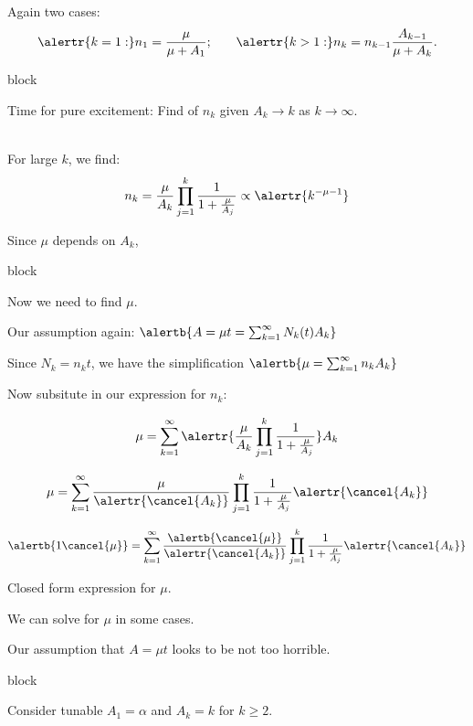     Again two cases:
    $$
    {
      \alertr{k=1:}
      n_1 = \frac{\mu}{\mu+A_1};
    }
    \qquad
    {
      \alertr{k>1:}
      n_k
      =
      n_{k-1}\frac{A_{k-1}}{\mu + A_k}.
    }
    $$

  
  

{block}{}
  
  
    Time for pure excitement: Find  
    of $n_k$ given $A_k \rightarrow k$ as $k \rightarrow \infty$.
  
    \\
    For large $k$, we find:
    $$
    n_k = 
    \frac{\mu}{A_k}
    \prod_{j=1}^{k}
    \frac{1}{1 + \frac{\mu}{A_j}}
    \propto
    \alertr{ k^{-\mu-1}}
    $$
  
    Since $\mu$ depends on $A_k$, 
  
  

{block}{}
  
  
    Now we need to find $\mu$.
  
    Our assumption again:
    $
    \alertb{A = \mu t = \sum_{k=1}^{\infty} N_k(t) A_k}
    $
  
    Since $N_k = n_k t$, we have the simplification
    $
    \alertb{
    \mu = \sum_{k=1}^{\infty} n_k A_k}
    $
  
    Now subsitute in our expression for $n_k$:
          
    $$
    \mu = 
    \sum_{k=1}^{\infty} 
    \alertr{
      \frac{\mu}{A_k}
      \prod_{j=1}^{k}
      \frac{1}{1 + \frac{\mu}{A_j}}
    }
    A_k
    $$
    
    $$
    \mu = 
    \sum_{k=1}^{\infty} 
    \frac{\mu}{\alertr{\cancel{A_k}}}
    \prod_{j=1}^{k}
    \frac{1}{1 + \frac{\mu}{A_j}}
    \alertr{\cancel{A_k}}
    $$
          
    $$
    \alertb{1 \cancel{\mu}} = 
    \sum_{k=1}^{\infty} 
    \frac{\alertb{\cancel{\mu}}}{\alertr{\cancel{A_k}}}
    \prod_{j=1}^{k}
    \frac{1}{1 + \frac{\mu}{A_j}}
    \alertr{\cancel{A_k}}
    $$
        
      Closed form expression for $\mu$.
    
      We can solve for $\mu$ in some cases.
    
      Our assumption that $A = \mu t$ looks to be not too horrible.
  
  

{block}{}
    
    
      Consider tunable $A_{1} = \alpha$ and $A_{k} = k$ for $k \ge 2$.
     
